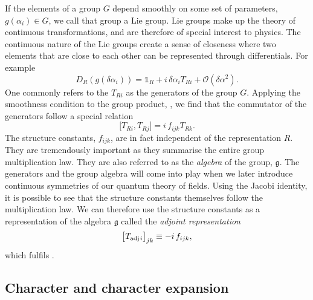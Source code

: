 If the elements of a group $G$ depend smoothly on some set of parameters,
$g(\alpha_i) \in G$, we call that group a Lie group. Lie groups make up the
theory of continuous transformations, and are therefore of special interest to
physics. The continuous nature of the Lie groups create a sense of closeness
where two elements that are close to each other can be represented through
differentials. For example
%
\begin{equation}
  D_R(g(\delta\alpha_i)) = \mathbb{1}_R + i\, \delta \alpha_i T_{Ri} +
    \mathcal{O}(\delta \alpha^2).
\end{equation}
%
One commonly refers to the $T_{Ri}$ as the generators of the group $G$. Applying
the smoothness condition to the group product, ,
we find that the commutator of the generators follow a special relation
%
\begin{equation} \label{eq-group_algebra}
  \big[ T_{Ri}, T_{Rj} \big] = i\, f_{ijk} T_{Rk}.
\end{equation}
%
The structure constants, $f_{ijk}$, are in fact independent of the
representation $R$. They are tremendously important as they summarise the entire
group multiplication law. They are also referred to as the \emph{algebra} of the
group, $\mathfrak{g}$. The generators and the group algebra will come into play
when we later introduce continuous symmetries of our quantum theory of fields.
Using the Jacobi identity, it is possible to see that the structure constants
themselves follow the multiplication law. We can therefore use the structure
constants as a representation of the algebra $\mathfrak{g}$ called the
\emph{adjoint representation}
%
\begin{equation}
  \big[ T_{\text{adj}\hskip.2ex i} \big]_{jk} \equiv -i\, f_{ijk},
\end{equation}
%
which fulfils .

\subsection{Character and character expansion}


